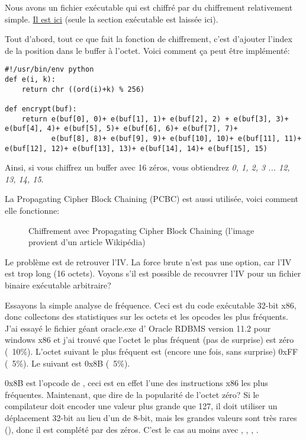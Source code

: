 
Nous avons un fichier exécutable qui est chiffré par du chiffrement relativement simple.
\href{\RepoURL/examples/simple_exec_crypto/files/cipher.bin}{Il est ici}
(seule la section exécutable est laissée ici).

Tout d'abord, tout ce que fait la fonction de chiffrement, c'est d'ajouter l'index
de la position dans le buffer à l'octet.
Voici comment ça peut être implémenté:

\begin{lstlisting}[caption=Python script,style=custompy]
#!/usr/bin/env python
def e(i, k):
    return chr ((ord(i)+k) % 256)

def encrypt(buf):
    return e(buf[0], 0)+ e(buf[1], 1)+ e(buf[2], 2) + e(buf[3], 3)+ e(buf[4], 4)+ e(buf[5], 5)+ e(buf[6], 6)+ e(buf[7], 7)+
           e(buf[8], 8)+ e(buf[9], 9)+ e(buf[10], 10)+ e(buf[11], 11)+ e(buf[12], 12)+ e(buf[13], 13)+ e(buf[14], 14)+ e(buf[15], 15)
\end{lstlisting}

Ainsi, si vous chiffrez un buffer avec 16 zéros, vous obtiendrez \emph{0, 1, 2, 3 ... 12, 13, 14, 15}.

La Propagating Cipher Block Chaining (PCBC) est aussi utilisée, voici comment elle
fonctionne:

\begin{figure}[H]
\centering
{}
\caption{Chiffrement avec Propagating Cipher Block Chaining (l'image provient d'un article Wikipédia)}
\end{figure}

Le problème est de retrouver l'\ac{IV}.
La force brute n'est pas une option, car l'\ac{IV} est trop long (16 octets).
Voyons s'il est possible de recouvrer l'\ac{IV} pour un fichier binaire exécutable arbitraire?

Essayons la simple analyse de fréquence.
Ceci est du code exécutable 32-bit x86, donc collectons des statistiques sur les
octets et les opcodes les plus fréquents.
J'ai essayé le fichier géant oracle.exe d' Oracle RDBMS version 11.2 pour windows
x86 et j'ai trouvé que l'octet le plus fréquent (pas de surprise) est zéro (~10\%).
L'octet suivant le plus fréquent est (encore une fois, sans surprise) 0xFF (~5\%).
Le suivant est 0x8B (~5\%).

0x8B est l'opcode de , ceci est en effet l'une des instructions x86 les
plus fréquentes.
Maintenant, que dire de la popularité de l'octet zéro?
Si le compilateur doit encoder une valeur plus grande que 127, il doit utiliser un
déplacement 32-bit au lieu d'un de 8-bit, mais les grandes valeurs sont très rares (),
donc il est complété par des zéros.
C'est le cas au moins avec , , , .

